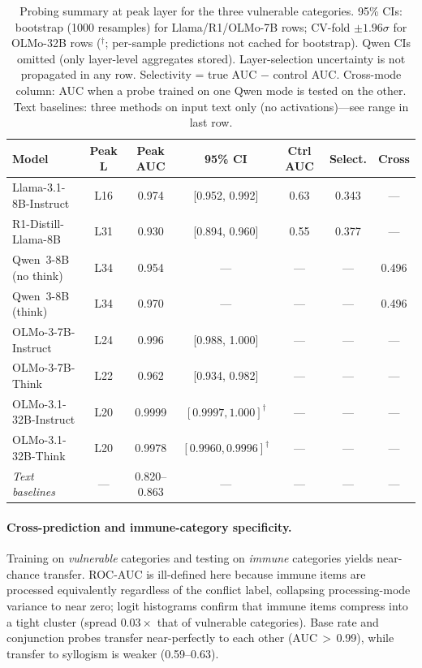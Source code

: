\documentclass{article}
\begin{document}
\begin{table}[t]
\centering
\caption{Probing summary at peak layer for the three
  vulnerable categories.  95\% CIs: bootstrap (1000 resamples) for
  Llama/R1/OLMo-7B rows; CV-fold $\pm 1.96\sigma$ for OLMo-32B rows
  (${}^\dagger$; per-sample predictions not cached for bootstrap).
  Qwen CIs omitted (only layer-level aggregates stored).
  Layer-selection uncertainty is not propagated in any row.
  Selectivity = true AUC $-$ control AUC.  Cross-mode column:
  AUC when a probe trained on one Qwen mode is tested on the other.
  Text baselines: three methods on input text only (no activations)---see range in last row.}
\label{tab:probe_summary}
\vspace{4pt}
\small
\begin{tabular}{lcccccc}
\toprule
\textbf{Model} & \textbf{Peak L} & \textbf{Peak AUC} & \textbf{95\% CI} & \textbf{Ctrl AUC} & \textbf{Select.} & \textbf{Cross} \\
\midrule
Llama-3.1-8B-Instruct & L16 & 0.974 & [0.952, 0.992] & 0.63 & 0.343 & --- \\
R1-Distill-Llama-8B   & L31 & 0.930 & [0.894, 0.960] & 0.55 & 0.377 & --- \\
Qwen~3-8B (no think)  & L34 & 0.954 & ---             & ---  & --- & 0.496 \\
Qwen~3-8B (think)     & L34 & 0.970 & ---             & ---  & --- & 0.496 \\
\midrule
OLMo-3-7B-Instruct    & L24 & 0.996 & [0.988, 1.000]  & ---  & --- & --- \\
OLMo-3-7B-Think       & L22 & 0.962 & [0.934, 0.982]  & ---  & --- & --- \\
\midrule
OLMo-3.1-32B-Instruct & L20 & 0.9999 & $[0.9997, 1.000]^\dagger$ & --- & --- & --- \\
OLMo-3.1-32B-Think    & L20 & 0.9978 & $[0.9960, 0.9996]^\dagger$ & --- & --- & --- \\
\midrule
\emph{Text baselines}  & --- & 0.820--0.863 & ---         & ---  & --- & --- \\
\bottomrule
\end{tabular}
\end{table}

\paragraph{Cross-prediction and immune-category specificity.}
Training on \emph{vulnerable} categories and testing on \emph{immune} categories yields near-chance transfer.  ROC-AUC is ill-defined here because immune items are processed equivalently regardless of the conflict label, collapsing processing-mode variance to near zero; logit histograms confirm that immune items compress into a tight cluster (spread $0.03\times$ that of vulnerable categories).  Base rate and conjunction probes transfer near-perfectly to each other (AUC\,$>$\,0.99), while transfer to syllogism is weaker (0.59--0.63).
\end{document}
